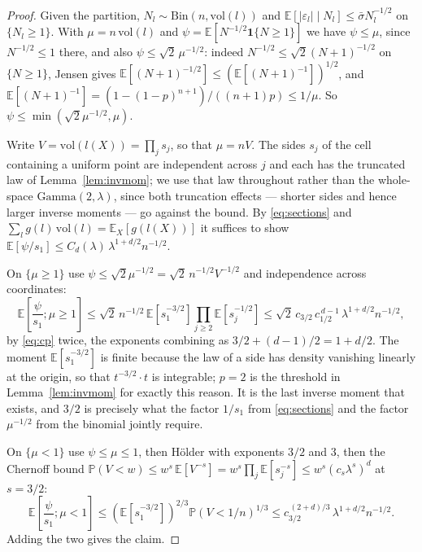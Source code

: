 \documentclass[12pt,a4paper]{article}
\numberwithin{equation}{section}
\theoremstyle{plain}
\theoremstyle{definition}
\newcommand{\E}{\mathbb{E}}
\newcommand{\Prob}{\mathbb{P}}
\newcommand{\abs}[1]{\left| #1 \right|}
\begin{document}
	\begin{proof}
		Given the partition, $N_l \sim \mathrm{Bin}(n, \mathrm{vol}(l))$ and
		$\E[\abs{\varepsilon_l} \mid N_l] \leq \bar{\sigma} N_l^{-1/2}$ on
		$\{N_l \geq 1\}$. With $\mu = n\,\mathrm{vol}(l)$ and
		$\psi = \E[N^{-1/2}\mathbf{1}\{N \geq 1\}]$ we have
		$\psi \leq \mu$, since $N^{-1/2} \leq 1$ there, and also
		$\psi \leq \sqrt{2}\,\mu^{-1/2}$: indeed
		$N^{-1/2} \leq \sqrt{2}(N+1)^{-1/2}$ on $\{N \geq 1\}$, Jensen gives
		$\E[(N+1)^{-1/2}] \leq (\E[(N+1)^{-1}])^{1/2}$, and
		$\E[(N+1)^{-1}] = (1-(1-p)^{n+1})/((n+1)p) \leq 1/\mu$. So
		$\psi \leq \min(\sqrt{2}\mu^{-1/2}, \mu)$.

		Write $V = \mathrm{vol}(l(X)) = \prod_j s_j$, so that $\mu = nV$. The
		sides $s_j$ of the cell containing a uniform point are independent
		across $j$ and each has the truncated law of Lemma~\ref{lem:invmom}; we
		use that law throughout rather than the whole-space $\mathrm{Gamma}(2,\lambda)$,
		since both truncation effects --- shorter sides and hence larger inverse
		moments --- go against the bound. By \eqref{eq:sections} and
		$\sum_l g(l)\,\mathrm{vol}(l) = \E_X[g(l(X))]$ it suffices to show
		$\E[\psi/s_1] \leq C_d(\lambda)\,\lambda^{1+d/2} n^{-1/2}$.

		On $\{\mu \geq 1\}$ use $\psi \leq \sqrt{2}\mu^{-1/2}
		= \sqrt{2}\,n^{-1/2}V^{-1/2}$ and independence across coordinates:
		\begin{equation}
			\E\!\left[\frac{\psi}{s_1}; \mu \geq 1\right]
			\leq \sqrt{2}\,n^{-1/2}\,
			\E\!\left[s_1^{-3/2}\right]\prod_{j \geq 2}\E\!\left[s_j^{-1/2}\right]
			\leq \sqrt{2}\,c_{3/2}\,c_{1/2}^{\,d-1}\,\lambda^{1+d/2} n^{-1/2},
		\end{equation}
		by \eqref{eq:cp} twice, the exponents combining as
		$3/2 + (d-1)/2 = 1 + d/2$. The moment $\E[s_1^{-3/2}]$ is finite
		because the law of a side has density vanishing linearly at the origin,
		so that $t^{-3/2}\cdot t$ is integrable; $p = 2$ is the threshold in
		Lemma~\ref{lem:invmom} for exactly this reason. It is the last inverse
		moment that exists, and $3/2$ is precisely what the factor $1/s_1$ from
		\eqref{eq:sections} and the factor $\mu^{-1/2}$ from the binomial
		jointly require.

		On $\{\mu < 1\}$ use $\psi \leq \mu \leq 1$, then H\"{o}lder with
		exponents $3/2$ and $3$, then the Chernoff bound
		$\Prob(V < w) \leq w^s\,\E[V^{-s}] = w^s\prod_j \E[s_j^{-s}]
		\leq w^s (c_s \lambda^s)^d$ at $s = 3/2$:
		\begin{equation}
			\E\!\left[\frac{\psi}{s_1}; \mu < 1\right]
			\leq \left(\E\!\left[s_1^{-3/2}\right]\right)^{2/3}
			\Prob(V < 1/n)^{1/3}
			\leq c_{3/2}^{\,(2+d)/3}\,\lambda^{1+d/2} n^{-1/2}.
		\end{equation}
		Adding the two gives the claim.
	\end{proof}
\end{document}
